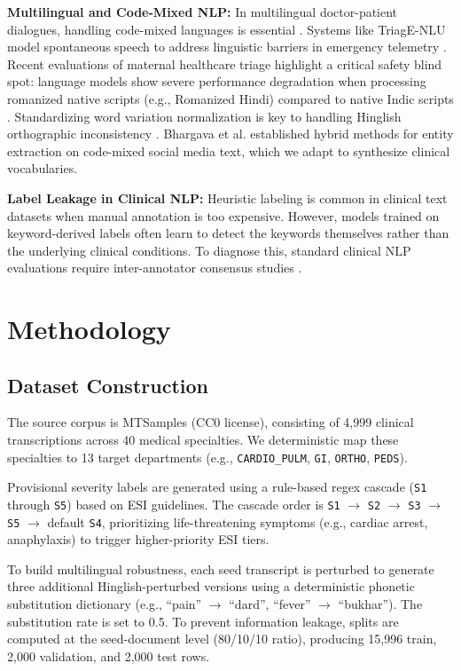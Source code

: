 \documentclass[10pt,conference]{IEEEtran}
\begin{document}
\textbf{Multilingual and Code-Mixed NLP:} In multilingual doctor-patient dialogues, handling code-mixed languages is essential \cite{nlp4health2025}. Systems like TriagE-NLU model spontaneous speech to address linguistic barriers in emergency telemetry \cite{triagenlu2025}. Recent evaluations of maternal healthcare triage highlight a critical safety blind spot: language models show severe performance degradation when processing romanized native scripts (e.g., Romanized Hindi) compared to native Indic scripts \cite{romanized2026}. Standardizing word variation normalization is key to handling Hinglish orthographic inconsistency \cite{singh2018automatic}. Bhargava et al. \cite{bhargava2018named} established hybrid methods for entity extraction on code-mixed social media text, which we adapt to synthesize clinical vocabularies.

\textbf{Label Leakage in Clinical NLP:} Heuristic labeling is common in clinical text datasets when manual annotation is too expensive. However, models trained on keyword-derived labels often learn to detect the keywords themselves rather than the underlying clinical conditions. To diagnose this, standard clinical NLP evaluations require inter-annotator consensus studies \cite{landis1977measurement}.

\section{Methodology}

\subsection{Dataset Construction}
The source corpus is MTSamples (CC0 license), consisting of 4,999 clinical transcriptions across 40 medical specialties. We deterministic map these specialties to 13 target departments (e.g., \texttt{CARDIO\_PULM}, \texttt{GI}, \texttt{ORTHO}, \texttt{PEDS}).

Provisional severity labels are generated using a rule-based regex cascade (\texttt{S1} through \texttt{S5}) based on ESI guidelines. The cascade order is \texttt{S1} $\rightarrow$ \texttt{S2} $\rightarrow$ \texttt{S3} $\rightarrow$ \texttt{S5} $\rightarrow$ default \texttt{S4}, prioritizing life-threatening symptoms (e.g., cardiac arrest, anaphylaxis) to trigger higher-priority ESI tiers.

To build multilingual robustness, each seed transcript is perturbed to generate three additional Hinglish-perturbed versions using a deterministic phonetic substitution dictionary (e.g., ``pain'' $\rightarrow$ ``dard'', ``fever'' $\rightarrow$ ``bukhar''). The substitution rate is set to 0.5. To prevent information leakage, splits are computed at the seed-document level (80/10/10 ratio), producing 15,996 train, 2,000 validation, and 2,000 test rows.
\end{document}
